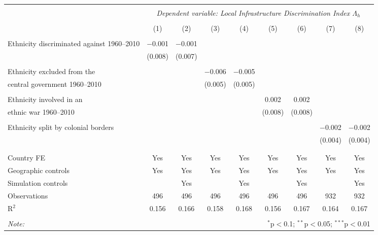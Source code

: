 \documentclass[]{beamer}   	%
\begin{document}
\begin{frame}
\begin{table}[t]
{  \begin{tabular}{@{\extracolsep{5pt}}lcccccccc}
  \\[-1.8ex]\hline
  \hline \\[-1.8ex]
   & \multicolumn{8}{c}{\textit{Dependent variable: Local Infrastructure Discrimination Index $\Lambda_{h}$}} \\
  \cline{2-9}
  \\[-1.8ex] & (1) & (2) & (3) & (4) & (5) & (6) & (7) & (8)\\
  \hline \\[-1.8ex]
   Ethnicity discriminated against 1960--2010 & $-$0.001 & $-$0.001 &  &  &  &  &  &  \\
  & (0.008) & (0.007) &  &  &  &  &  &  \\
    & & & & & & & & \\
   Ethnicity excluded from the &  &  & $-$0.006 & $-$0.005 &  &  &  &  \\
    \hspace*{3mm} central government 1960--2010 &  &  & (0.005) & (0.005) &  &  &  &  \\
    & & & & & & & & \\
   Ethnicity involved in an &  &  &  &  & 0.002 & 0.002 &  &  \\
    \hspace*{3mm}  ethnic war 1960--2010 &  &  &  &  & (0.008) & (0.008) &  &  \\
    & & & & & & & & \\
   Ethnicity split by colonial borders &  &  &  &  &  &  & $-$0.002 & $-$0.002 \\
   &  &  &  &  &  &  & (0.004) & (0.004) \\
    & & & & & & & & \\
  \hline \\[-1.8ex]
  Country FE & Yes & Yes & Yes & Yes & Yes & Yes & Yes & Yes \\
  Geographic controls & Yes & Yes & Yes & Yes & Yes & Yes & Yes & Yes \\
  Simulation controls &  & Yes &  & Yes &  & Yes &  & Yes \\
  Observations & 496 & 496 & 496 & 496 & 496 & 496 & 932 & 932 \\
  R$^{2}$ & 0.156 & 0.166 & 0.158 & 0.168 & 0.156 & 0.167 & 0.164 & 0.167 \\
  \hline
  \hline \\[-1.8ex]
  \textit{Note:}  & \multicolumn{8}{r}{$^{*}$p$<$0.1; $^{**}$p$<$0.05; $^{***}$p$<$0.01} \\
  \end{tabular}

}
\end{table}
%
\end{frame}
\end{document}
